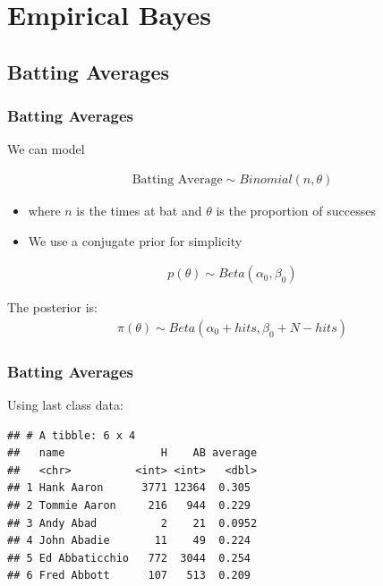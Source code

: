 \documentclass[
  shownotes,
  xcolor={svgnames},
  hyperref={colorlinks,citecolor=DarkBlue,linkcolor=DarkRed,urlcolor=DarkBlue}
  ]{beamer}
\begin{document}
\section{Empirical Bayes}
\subsection{Batting Averages}
\begin{frame}[fragile]
\frametitle{Batting Averages}


We can model

\begin{align}
\text{Batting Average} \sim Binomial(n,\theta)
\end{align}

\begin{itemize}
\item where $n$ is the times at bat and $\theta$ is the proportion of successes
\item  We  use a conjugate prior for simplicity
\end{itemize}


\begin{align}
p(\theta) \sim Beta(\alpha_0,\beta_0)
\end{align}

The posterior is:
\begin{align}
\pi(\theta)\sim Beta(\alpha_0+hits,\beta_0+N-hits)
\end{align}

\end{frame}
\begin{frame}[fragile]
\frametitle{Batting Averages}

Using last class data:

\bigskip
\begin{small}
\begin{verbatim}
## # A tibble: 6 x 4
##   name               H    AB average
##   <chr>          <int> <int>   <dbl>
## 1 Hank Aaron      3771 12364  0.305 
## 2 Tommie Aaron     216   944  0.229 
## 3 Andy Abad          2    21  0.0952
## 4 John Abadie       11    49  0.224 
## 5 Ed Abbaticchio   772  3044  0.254 
## 6 Fred Abbott      107   513  0.209
\end{verbatim}
\end{small}

\end{frame}
\end{document}
